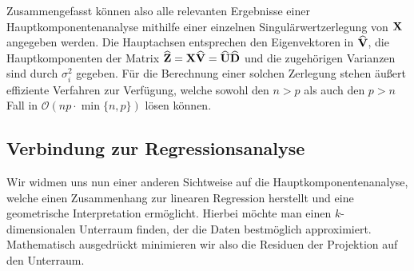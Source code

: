 Zusammengefasst können also alle relevanten Ergebnisse einer Hauptkomponentenanalyse mithilfe einer einzelnen Singulärwertzerlegung von $\mathbf{X}$ angegeben werden. Die Hauptachsen entsprechen den Eigenvektoren in $\widehat{\mathbf{V}}$, die Hauptkomponenten der Matrix $\widehat{\mathbf{Z}} = \mathbf{X} \widehat{\mathbf{V}} = \widehat{\mathbf{U}} \widehat{\mathbf{D}}$ und die zugehörigen Varianzen sind durch $\sigma_i^2$ gegeben. Für die Berechnung einer solchen Zerlegung stehen äußert effiziente Verfahren zur Verfügung, welche sowohl den $n>p$ als auch den $p>n$ Fall in $\mathcal{O}(np \cdot \min\{n,p\})$ lösen können. 

\subsection{Verbindung zur Regressionsanalyse}

Wir widmen uns nun einer anderen Sichtweise auf die Hauptkomponentenanalyse, welche einen Zusammenhang zur linearen Regression herstellt und eine geometrische Interpretation ermöglicht. Hierbei möchte man einen $k$-dimensionalen Unterraum finden, der die Daten bestmöglich approximiert. Mathematisch ausgedrückt minimieren wir also die Residuen der Projektion auf den Unterraum.

